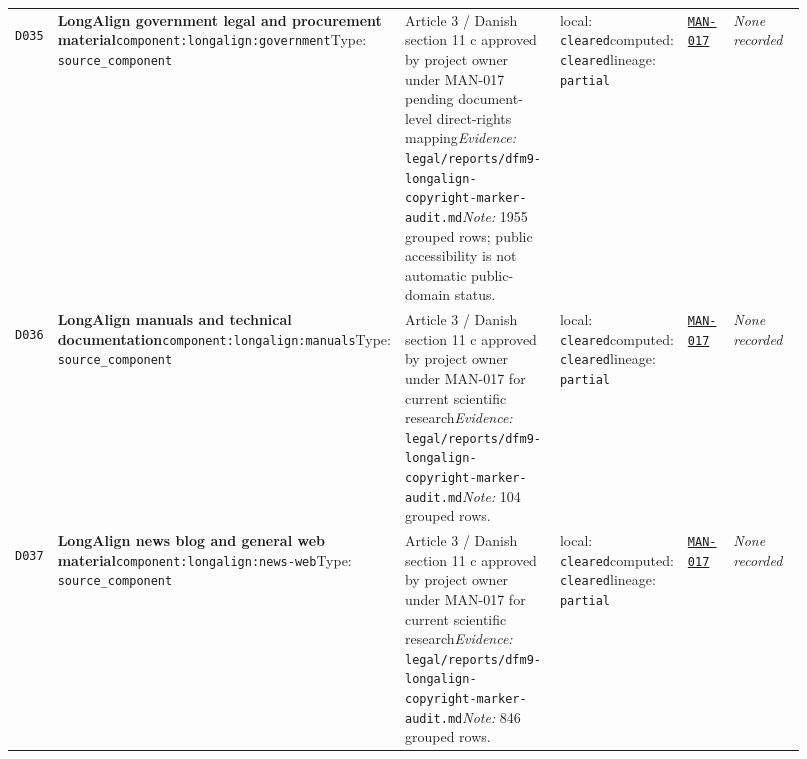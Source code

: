 \documentclass[9pt,a4paper]{article}
\newcommand{\depid}[1]{\hypertarget{dep:#1}{\texttt{#1}}}
\begin{document}
\begin{landscape}
\begin{longtable}{@{}L{0.035\linewidth}L{0.185\linewidth}L{0.27\linewidth}L{0.09\linewidth}L{0.10\linewidth}L{0.24\linewidth}@{}}
\depid{D035} & \textbf{LongAlign government legal and procurement material}\newline \nolinkurl{component:longalign:government}\newline Type: \texttt{source\_component} & Article 3 / Danish section 11 c approved by project owner under MAN-017 pending document-level direct-rights mapping\newline \textit{Evidence:} \nolinkurl{legal/reports/dfm9-longalign-copyright-marker-audit.md}\newline \textit{Note:} 1955 grouped rows; public accessibility is not automatic public-domain status. & local: \texttt{cleared}\newline computed: \texttt{cleared}\newline lineage: \texttt{partial} & \hyperlink{manual:MAN-017}{\texttt{MAN-017}} & \textit{None recorded} \\
\depid{D036} & \textbf{LongAlign manuals and technical documentation}\newline \nolinkurl{component:longalign:manuals}\newline Type: \texttt{source\_component} & Article 3 / Danish section 11 c approved by project owner under MAN-017 for current scientific research\newline \textit{Evidence:} \nolinkurl{legal/reports/dfm9-longalign-copyright-marker-audit.md}\newline \textit{Note:} 104 grouped rows. & local: \texttt{cleared}\newline computed: \texttt{cleared}\newline lineage: \texttt{partial} & \hyperlink{manual:MAN-017}{\texttt{MAN-017}} & \textit{None recorded} \\
\depid{D037} & \textbf{LongAlign news blog and general web material}\newline \nolinkurl{component:longalign:news-web}\newline Type: \texttt{source\_component} & Article 3 / Danish section 11 c approved by project owner under MAN-017 for current scientific research\newline \textit{Evidence:} \nolinkurl{legal/reports/dfm9-longalign-copyright-marker-audit.md}\newline \textit{Note:} 846 grouped rows. & local: \texttt{cleared}\newline computed: \texttt{cleared}\newline lineage: \texttt{partial} & \hyperlink{manual:MAN-017}{\texttt{MAN-017}} & \textit{None recorded} \\

\end{longtable}
\end{landscape}
\end{document}
